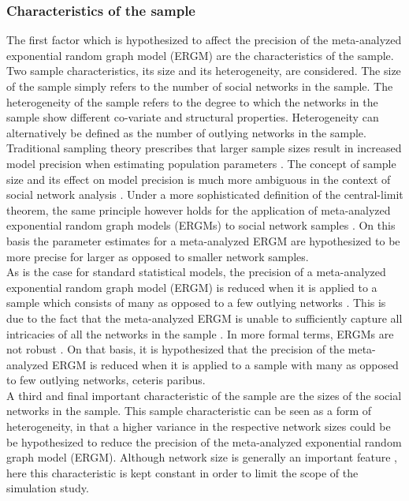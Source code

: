 \documentclass[a4paper, man, floatsintext]{apa6}
\begin{document}
\subsubsection{Characteristics of the sample} The first factor which is hypothesized to affect the precision of the meta-analyzed exponential random graph model (ERGM) are the characteristics of the sample. Two sample characteristics, its size and its heterogeneity, are considered. The size of the sample simply refers to the number of social networks in the sample. The heterogeneity of the sample refers to the degree to which the networks in the sample show different co-variate and structural properties. Heterogeneity can alternatively be defined as the number of outlying networks in the sample.
\\
Traditional sampling theory prescribes that larger sample sizes result in increased model precision when estimating population parameters \cite{lohr2009sampling}. The concept of sample size and its effect on model precision is much more ambiguous in the context of social network analysis \cite{kolaczyk2015question}. \clearpage \noindent Under a more sophisticated definition of the central-limit theorem, the same principle however holds for the application of meta-analyzed exponential random graph models (ERGMs) to social network samples \cite{kolaczyk2015question}. On this basis the parameter estimates for a meta-analyzed ERGM are hypothesized to be more precise for larger as opposed to smaller network samples. 
\\
As is the case for standard statistical models, the precision of a meta-analyzed exponential random graph model (ERGM) is reduced when it is applied to a sample which consists of many as opposed to a few outlying networks \cite{koskinen2018outliers}. This is due to the fact that the meta-analyzed ERGM is unable to sufficiently capture all intricacies of all the networks in the sample \cite{koskinen2018outliers}. In more formal terms, ERGMs are not robust \cite{rehnberg2016exponential}. On that basis, it is hypothesized that the precision of the meta-analyzed ERGM is reduced when it is applied to a sample with many as opposed to few outlying networks, ceteris paribus. 
\\
A third and final important characteristic of the sample are the sizes of the social networks in the sample. This sample characteristic can be seen as a form of heterogeneity, in that a higher variance in the respective network sizes could be be hypothesized to reduce the precision of the meta-analyzed exponential random graph model (ERGM). Although network size is generally an important feature \cite{kolaczyk2015question}, here this characteristic is kept constant in order to limit the scope of the simulation study. 
\\
\end{document}
